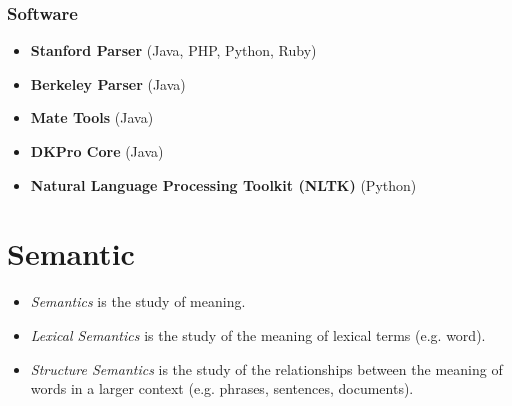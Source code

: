             \subsubsection{Software} %
                \begin{itemize}
                	\item \textbf{Stanford Parser} (Java, PHP, Python, Ruby)
                	\item \textbf{Berkeley Parser} (Java)
                	\item \textbf{Mate Tools} (Java)
                	\item \textbf{DKPro Core} (Java)
                	\item \textbf{Natural Language Processing Toolkit (NLTK)} (Python)
                \end{itemize}

    \section{Semantic} %
        \begin{itemize}
        	\item \textit{Semantics} is the study of meaning.
        	\item \textit{Lexical Semantics} is the study of the meaning of lexical terms (e.g. word).
        	\item \textit{Structure Semantics} is the study of the relationships between the meaning of words in a larger context (e.g. phrases, sentences, documents).
        \end{itemize}

